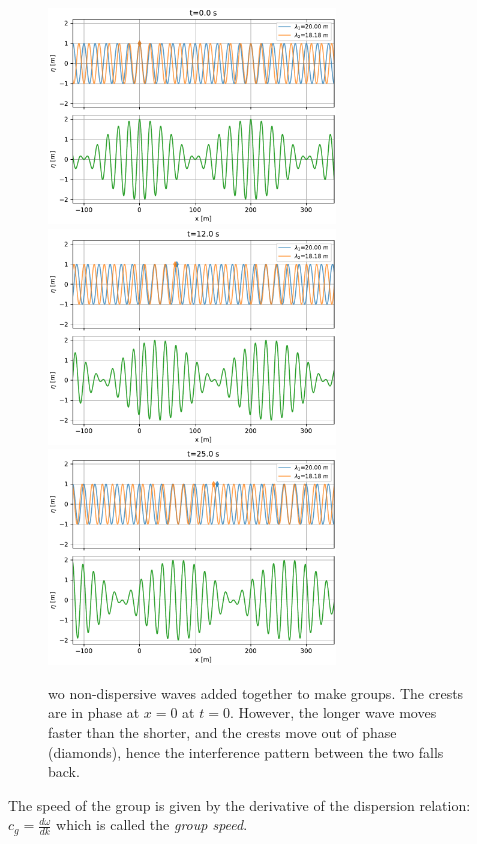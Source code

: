 \begin{figure}[hbt]
  \begin{center}
    \includegraphics[width=3in]{figs/Waves/InterferingWaves00.pdf}
    \includegraphics[width=3in]{figs/Waves/InterferingWaves12.pdf}
    \includegraphics[width=3in]{figs/Waves/InterferingWaves25.pdf}
    \caption{wo non-dispersive waves added together to make groups.  The crests are in phase at $x=0$ at $t=0$. However, the longer wave moves faster than the shorter, and the crests move out of phase (diamonds), hence the interference pattern between the two falls back.}
    \label{fig:InterferingWaves}  
  \end{center}
\end{figure}

The speed of the group is given by the derivative of the dispersion relation: $c_g = \frac{d\omega}{dk}$ which is called the \emph{group speed}.  


